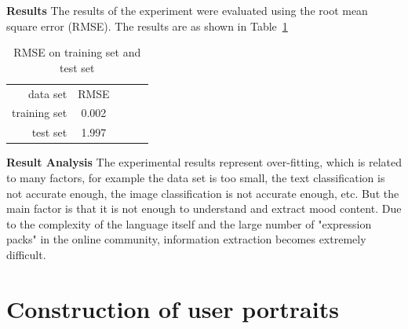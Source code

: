 \documentclass[10pt,twocolumn,letterpaper]{article}
\begin{document}
    \textbf{Results}
    The results of the experiment were evaluated using the root mean square error (RMSE).
    The results are as shown in Table~\ref{rmseresult}
    \setlength{\tabcolsep}{40pt}
    \begin{table}
    \newcommand{\tabincell}[2]{\begin{tabular}{@{}#1@{}}#2\end{tabular}}
    \begin{center}
    \caption{RMSE on training set and test set}
    \vspace{0.5cm}
    \label{rmseresult}
    \begin{tabular}{rcccc}
    \hline\noalign{\smallskip}
    data set & RMSE \\
    \noalign{\smallskip}
    \hline
    \noalign{\smallskip}
    training set & 0.002\\
    test set & 1.997\\
    \hline
    \end{tabular}
    \end{center}
    \end{table}
    \setlength{\tabcolsep}{1.4pt}

    \textbf{Result Analysis}
    The experimental results represent over-fitting, which is related to many factors, for example the data set is too small, the text classification is not accurate enough, the image classification is not accurate enough, etc.
    But the main factor is that it is not enough to understand and extract mood content.
    Due to the complexity of the language itself and the large number of "expression packs" in the online community, information extraction becomes extremely difficult.

\section{Construction of user portraits}
\end{document}
